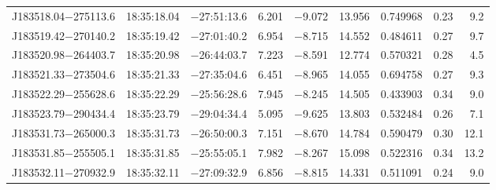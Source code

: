 \begin{table*}
\begin{tabular}{lcccccccr}
J183518.04$-$275113.6 & 18:35:18.04 & $-$27:51:13.6 &  6.201 & $-$9.072 & 13.956 & 0.749968 & 0.23 & 9.2 \\
J183519.42$-$270140.2 & 18:35:19.42 & $-$27:01:40.2 &  6.954 & $-$8.715 & 14.552 & 0.484611 & 0.27 & 9.7 \\
J183520.98$-$264403.7 & 18:35:20.98 & $-$26:44:03.7 &  7.223 & $-$8.591 & 12.774 & 0.570321 & 0.28 & 4.5 \\
J183521.33$-$273504.6 & 18:35:21.33 & $-$27:35:04.6 &  6.451 & $-$8.965 & 14.055 & 0.694758 & 0.27 & 9.3 \\
J183522.29$-$255628.6 & 18:35:22.29 & $-$25:56:28.6 &  7.945 & $-$8.245 & 14.505 & 0.433903 & 0.34 & 9.0 \\
J183523.79$-$290434.4 & 18:35:23.79 & $-$29:04:34.4 &  5.095 & $-$9.625 & 13.803 & 0.532484 & 0.26 & 7.1 \\
J183531.73$-$265000.3 & 18:35:31.73 & $-$26:50:00.3 &  7.151 & $-$8.670 & 14.784 & 0.590479 & 0.30 & 12.1 \\
J183531.85$-$255505.1 & 18:35:31.85 & $-$25:55:05.1 &  7.982 & $-$8.267 & 15.098 & 0.522316 & 0.34 & 13.2 \\
J183532.11$-$270932.9 & 18:35:32.11 & $-$27:09:32.9 &  6.856 & $-$8.815 & 14.331 & 0.511091 & 0.24 & 9.0 \\
\hline
\end{tabular}
\end{table*}

\addtocounter{table}{-1}

